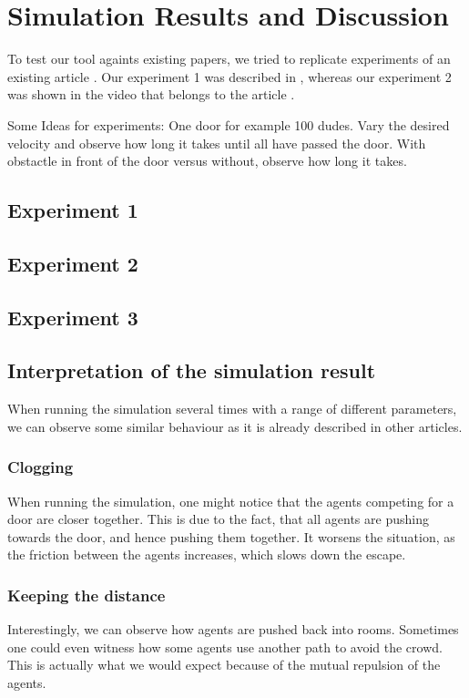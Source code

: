\documentclass[11pt]{article}
\begin{document}
\section{Simulation Results and Discussion}
To test our tool againts existing papers, we tried to replicate experiments of an existing article \cite{Helbing}. Our experiment 1 was described in \cite{Helbing}, whereas our experiment 2 was shown in the video that belongs to the article \cite{Helbing}.  

Some Ideas for experiments: One door for example 100 dudes. Vary the desired velocity and observe how long it takes until all have passed the door.
With obstactle in front of the door versus without, observe how long it takes.


\subsection{Experiment 1}

\subsection{Experiment 2}

\subsection{Experiment 3}

\subsection{Interpretation of the simulation result}
When running the simulation several times with a range of different parameters, we can observe some similar behaviour as it is already described in other articles.

\subsubsection{Clogging}
When running the simulation, one might notice that the agents competing for a door are closer together. This is due to the fact, that all agents are pushing towards the door, and hence pushing them together. It worsens the situation, as the friction between the agents increases, which slows down the escape.  
    
\subsubsection{Keeping the distance}
Interestingly, we can observe how agents are pushed back into rooms. Sometimes one could even witness how some agents use another path to avoid the crowd. This is actually what we would expect because of the mutual repulsion of the agents. 
\end{document}
